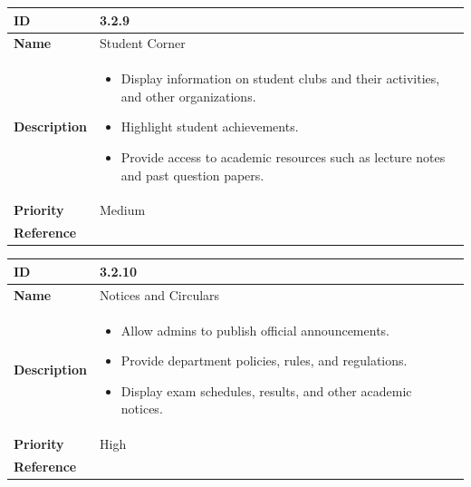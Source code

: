 \documentclass[11pt]{article}
\begin{document}
\begin{center}
\begin{tabular}{ | >{\bfseries}m{5em} | m{10cm} |  } 
  \hline
  ID & 3.2.9\\  
  \hline
  Name & Student Corner \\  
  \hline
  Description & 
  \begin{itemize}
      \item Display information on student clubs and their activities, and other organizations.
      \item Highlight student achievements.
      \item Provide access to academic resources such as lecture notes and past question papers.
  \end{itemize} \\ 
  \hline
  Priority & Medium\\
  \hline 
  Reference & \\
  \hline
\end{tabular}
\end{center}

\vspace{0.5cm}

\begin{center}
  \begin{tabular}{ | >{\bfseries}m{5em} | m{10cm} |  } 
    \hline
    ID & 3.2.10\\  
    \hline
    Name & Notices and Circulars \\  
    \hline
    Description & 
    \begin{itemize}
        \item Allow admins to publish official announcements.
        \item Provide department policies, rules, and regulations.
        \item Display exam schedules, results, and other academic notices.
    \end{itemize} \\ 
    \hline
    Priority & High\\
    \hline 
    Reference & \\
    \hline
    
  \end{tabular}
\end{center}

\vspace{0.5cm}
\end{document}
